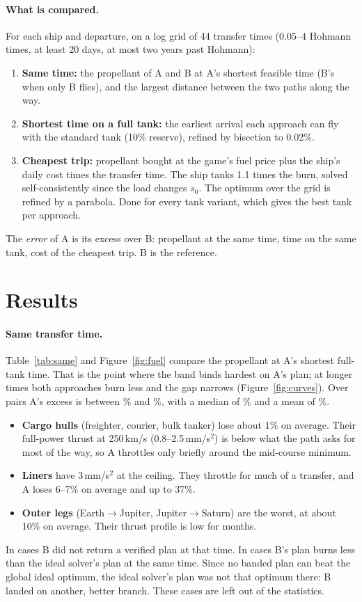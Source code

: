\documentclass[10pt,a4paper]{article}
\begin{document}
\paragraph{What is compared.} For each ship and departure, on a log grid of 44 transfer times
($0.05$--$4$ Hohmann times, at least 20 days, at most two years past Hohmann):
\begin{enumerate}
\item \textbf{Same time:} the propellant of A and B at A's shortest feasible time (B's when only B flies), and
  the largest distance between the two paths along the way.
\item \textbf{Shortest time on a full tank:} the earliest arrival each approach can fly with the standard tank
  (10\% reserve), refined by bisection to 0.02\%.
\item \textbf{Cheapest trip:} propellant bought at the game's fuel price plus the ship's daily cost times the
  transfer time. The ship tanks 1.1 times the burn, solved self-consistently since the load changes $s_0$. The
  optimum over the grid is refined by a parabola. Done for every tank variant, which gives the best tank per
  approach.
\end{enumerate}
The \emph{error} of A is its excess over B: propellant at the same time, time on the same tank, cost of the
cheapest trip. B is the reference.

\section{Results}

\paragraph{Same transfer time.} Table~\ref{tab:same} and Figure~\ref{fig:fuel} compare the propellant at A's shortest
full-tank time. That is the point where the band binds hardest on A's plan; at longer times both approaches burn
less and the gap narrows (Figure~\ref{fig:curves}). Over \sameN{} pairs A's excess is between \sameMin\% and
\sameMax\%, with a median of \sameMedian\% and a mean of \sameMean\%.
\begin{itemize}
\item \textbf{Cargo hulls} (freighter, courier, bulk tanker) lose about 1\% on average. Their full-power thrust at
  250\,km/s (0.8--2.5\,mm/s$^2$) is below what the path asks for most of the way, so A throttles only briefly
  around the mid-course minimum.
\item \textbf{Liners} have 3\,mm/s$^2$ at the ceiling. They throttle for much of a transfer, and A loses 6--7\% on
  average and up to 37\%.
\item \textbf{Outer legs} (Earth$\to$Jupiter, Jupiter$\to$Saturn) are the worst, at about 10\% on average. Their
  thrust profile is low for months.
\end{itemize}
In \sameNoB{} cases B did not return a verified plan at that time. In \sameBranch{} cases B's plan burns less than the
ideal solver's plan at the same time. Since no banded plan can beat the global ideal optimum, the ideal solver's
plan was not that optimum there: B landed on another, better branch. These cases are left out of the statistics.
\end{document}
